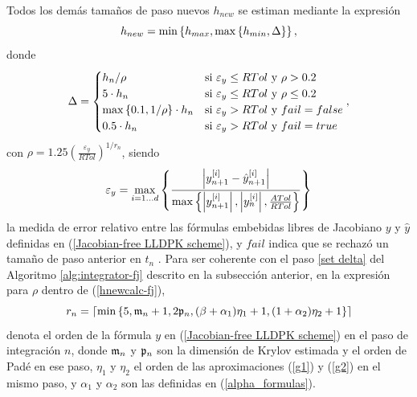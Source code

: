 Todos los demás tamaños de paso nuevos $h_{new}$ se estiman mediante la expresión
\begin{equation}
    h_{new} = \min\left\{ h_{max},\max\left\{ h_{min},\Delta \right\} \right\}, \label{hnewcalc-fj}
\end{equation}
donde
\begin{equation*}
    \Delta = \begin{cases}
        h_n/\rho & \text{si } \varepsilon_y\leq RTol \text{ y } \rho>0\mathord{.}2\\
        5\cdot h_n & \text{si } \varepsilon_y\leq RTol \text{ y } \rho\leq 0\mathord{.}2\\
        \max\left\{ 0\mathord{.}1,1/\rho \right\}\cdot h_n & \text{si } \varepsilon_y > RTol \text{ y } fail=false\\
        0\mathord{.}5\cdot h_n & \text{si } \varepsilon_y > RTol \text{ y } fail=true
        \end{cases},
\end{equation*}
con  $\rho = 1\mathord{.}25 \left( \frac{\varepsilon_y}{RTol} \right)^{1/r_n}$, siendo
\begin{equation}\label{epsilon_y-fj}
	\varepsilon_y =  \max_{i=1\ldots d}\left\{ \frac{\left\lvert y^{[i]}_{n+1}-\hat{y}^{[i]}_{n+1} \right\rvert}
	{\max\left\{ \left\lvert y^{[i]}_{n+1}  \right\rvert,\left\lvert y^{[i]}_{n}\right\rvert,\frac{ATol}{RTol} \right\}} \right\}
\end{equation}
la medida de error relativo entre las fórmulas embebidas libres de Jacobiano $y$ y $\hat y$ definidas en (\ref{Jacobian-free LLDPK scheme}), y $fail$ indica que se rechazó un tamaño de paso anterior en $t_n$ . Para ser coherente con el paso \ref{set delta} del Algoritmo \ref{alg:integrator-fj} descrito en la subsección anterior, en la expresión para $\rho$ dentro de (\ref{hnewcalc-fj}),
\[r_n=\lceil\mathrm{min}\left\{5,\mathfrak{m}_{n}+1,2\mathfrak{p}_{n},(\beta+\alpha_1)\eta_1+1,(1+\alpha_2)\eta_2+1 \right\}\rceil\]
denota el orden de la fórmula $y$ en (\ref{Jacobian-free LLDPK scheme}) en el paso de integración $n$, donde $\mathfrak{m}_{n}$ y $\mathfrak{p}_{n}$ son la dimensión de Krylov estimada y el orden de Padé en ese paso, $\eta_1$ y $\eta_2$ el orden de las aproximaciones (\ref{g1}) y (\ref{g2}) en el mismo paso, y
$\alpha_1$ y $\alpha_2$ son las definidas en (\ref{alpha_formulas}).

